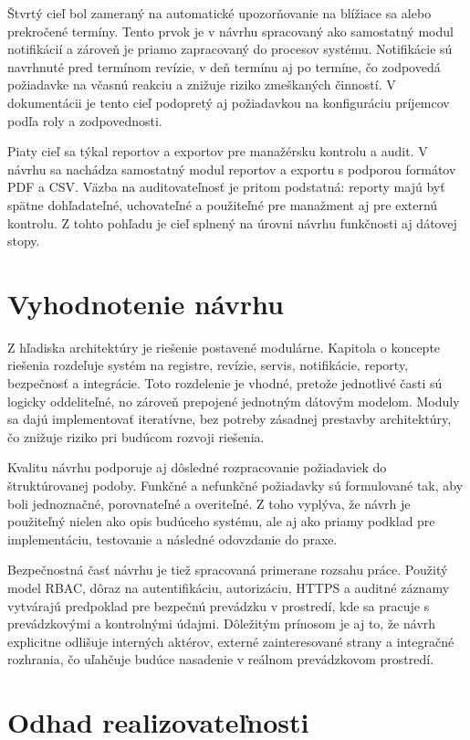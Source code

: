 Štvrtý cieľ bol zameraný na automatické upozorňovanie na blížiace sa alebo prekročené termíny. Tento prvok je v návrhu spracovaný ako samostatný modul notifikácií a zároveň je priamo zapracovaný do procesov systému. Notifikácie sú navrhnuté pred termínom revízie, v deň termínu aj po termíne, čo zodpovedá požiadavke na včasnú reakciu a znižuje riziko zmeškaných činností. V dokumentácii je tento cieľ podopretý aj požiadavkou na konfiguráciu príjemcov podľa roly a zodpovednosti.

Piaty cieľ sa týkal reportov a exportov pre manažérsku kontrolu a audit. V návrhu sa nachádza samostatný modul reportov a exportu s podporou formátov PDF a CSV. Väzba na auditovateľnosť je pritom podstatná: reporty majú byť spätne dohľadateľné, uchovateľné a použiteľné pre manažment aj pre externú kontrolu. Z tohto pohľadu je cieľ splnený na úrovni návrhu funkčnosti aj dátovej stopy.

\section{Vyhodnotenie návrhu}

Z hľadiska architektúry je riešenie postavené modulárne. Kapitola o koncepte riešenia rozdeľuje systém na registre, revízie, servis, notifikácie, reporty, bezpečnosť a integrácie. Toto rozdelenie je vhodné, pretože jednotlivé časti sú logicky oddeliteľné, no zároveň prepojené jednotným dátovým modelom. Moduly sa dajú implementovať iteratívne, bez potreby zásadnej prestavby architektúry, čo znižuje riziko pri budúcom rozvoji riešenia.

Kvalitu návrhu podporuje aj dôsledné rozpracovanie požiadaviek do štruktúrovanej podoby. Funkčné a nefunkčné požiadavky sú formulované tak, aby boli jednoznačné, porovnateľné a overiteľné. Z toho vyplýva, že návrh je použiteľný nielen ako opis budúceho systému, ale aj ako priamy podklad pre implementáciu, testovanie a následné odovzdanie do praxe.

Bezpečnostná časť návrhu je tiež spracovaná primerane rozsahu práce. Použitý model RBAC, dôraz na autentifikáciu, autorizáciu, HTTPS a auditné záznamy vytvárajú predpoklad pre bezpečnú prevádzku v prostredí, kde sa pracuje s prevádzkovými a kontrolnými údajmi. Dôležitým prínosom je aj to, že návrh explicitne odlišuje interných aktérov, externé zainteresované strany a integračné rozhrania, čo uľahčuje budúce nasadenie v reálnom prevádzkovom prostredí.

\section{Odhad realizovateľnosti}

